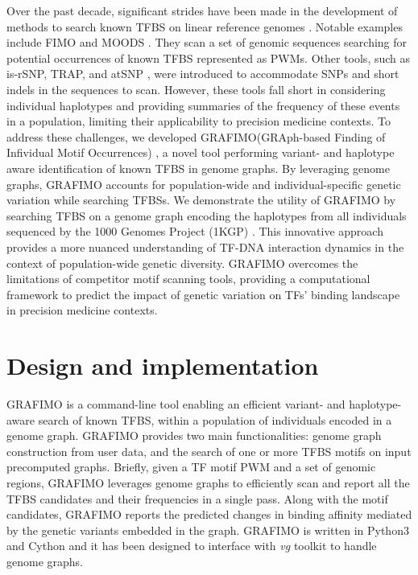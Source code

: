 \documentclass[a4paper, titlepage, openright]{book}
\newcommand{\grafimo}{GRAFIMO\xspace}
\begin{document}
Over the past decade, significant strides have been made in the development of methods to search known TFBS on linear reference genomes \citep{tognon2023survey, boeva2016analysis}. Notable examples include FIMO \citep{grant2011fimo} and MOODS \citep{korhonen2009moods}. They scan a set of genomic sequences searching for potential occurrences of known TFBS represented as PWMs. Other tools, such as is-rSNP, TRAP, and atSNP \citep{macintyre2010rsnp, thomas2011transcription, zuo2015atsnp}, were introduced to accommodate SNPs and short indels in the sequences to scan. However, these tools fall short in considering individual haplotypes and providing summaries of the frequency of these events in a population, limiting their applicability to precision medicine contexts. To address these challenges, we developed \grafimo (GRAph-based Finding of Infividual Motif Occurrences) \citep{tognon2021grafimo}, a novel tool performing variant- and haplotype aware identification of known TFBS in genome graphs. By leveraging genome graphs, \grafimo accounts for population-wide and individual-specific genetic variation while searching TFBSs. We demonstrate the utility of \grafimo by searching TFBS on a genome graph encoding the haplotypes from all individuals sequenced by the 1000 Genomes Project (1KGP) \citep{siva20081000, zheng2017alignment}. This innovative approach provides a more nuanced understanding of TF-DNA interaction dynamics in the context of population-wide genetic diversity. \grafimo overcomes the limitations of competitor motif scanning tools, providing a computational framework to predict the impact of genetic variation on TFs' binding landscape in precision medicine contexts.

\section{Design and implementation}
\grafimo is a command-line tool enabling an efficient variant- and haplotype-aware search of known TFBS, within a population of individuals encoded in a genome graph. \grafimo provides two main functionalities: genome graph construction from user data, and the search of one or more TFBS motifs on input precomputed graphs. Briefly, given a TF motif PWM and a set of genomic regions, \grafimo leverages genome graphs to efficiently scan and report all the TFBS candidates and their frequencies in a single pass. Along with the motif candidates, \grafimo reports the predicted changes in binding affinity mediated by the genetic variants embedded in the graph. \grafimo is written in Python3 and Cython and it has been designed to interface with \emph{vg} toolkit to handle genome graphs.
\end{document}

